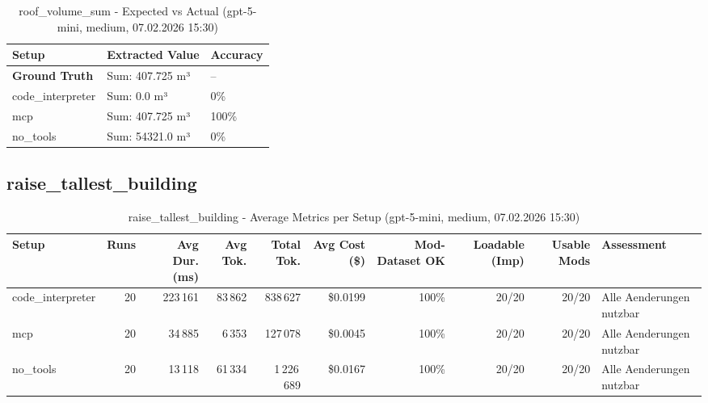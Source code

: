 \documentclass[a4paper,11pt]{article}
\begin{document}
\begin{table}[H]
\centering
\scriptsize
\caption{roof\_volume\_sum - Expected vs Actual (gpt-5-mini, medium, 07.02.2026 15:30)}
\begin{tabular}{l l l}
\toprule
Setup & Extracted Value & Accuracy \\
\midrule
\textbf{Ground Truth} & Sum: 407.725 m³ & -- \\
\midrule
code\_interpreter & Sum: 0.0 m³ & 0\% \\
mcp & Sum: 407.725 m³ & 100\% \\
no\_tools & Sum: 54321.0 m³ & 0\% \\
\bottomrule
\end{tabular}
\end{table}

\clearpage

\subsection{raise\_tallest\_building}

\begin{table}[H]
\centering
\scriptsize
\caption{raise\_tallest\_building - Average Metrics per Setup (gpt-5-mini, medium, 07.02.2026 15:30)}
\label{tab:combined\_raise\_tallest\_building\_metrics\_20260207}
\begin{tabular}{l r r r r r r r r l}
\toprule
Setup & Runs & Avg Dur. (ms) & Avg Tok. & Total Tok. & Avg Cost (\$) & Mod-Dataset OK & Loadable (Imp) & Usable Mods & Assessment \\
\midrule
code\_interpreter & 20 & 223\,161 & 83\,862 & 838\,627 & \$0.0199 & 100\% & 20/20 & 20/20 & Alle Aenderungen nutzbar \\
mcp & 20 & 34\,885 & 6\,353 & 127\,078 & \$0.0045 & 100\% & 20/20 & 20/20 & Alle Aenderungen nutzbar \\
no\_tools & 20 & 13\,118 & 61\,334 & 1\,226\,689 & \$0.0167 & 100\% & 20/20 & 20/20 & Alle Aenderungen nutzbar \\
\bottomrule
\end{tabular}
\end{table}
\end{document}
